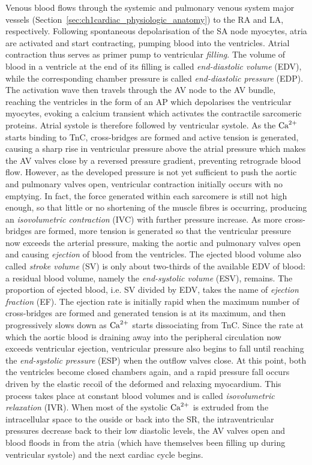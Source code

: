 \vspace{0.2cm}
Venous blood flows through the systemic and pulmonary venous system major vessels (Section~\ref{sec:ch1cardiac_physiologic_anatomy}) to the RA and LA, respectively. Following spontaneous depolarisation of the SA node myocytes, atria are activated and start contracting, pumping blood into the ventricles. Atrial contraction thus serves as primer pump to ventricular \textit{filling}. The volume of blood in a ventricle at the end of its filling is called \textit{end-diastolic volume} (\acs{EDV}), while the corresponding chamber pressure is called \textit{end-diastolic pressure} (\acs{EDP}). The activation wave then travels through the AV node to the AV bundle, reaching the ventricles in the form of an AP which depolarises the ventricular myocytes, evoking a calcium transient which activates the contractile sarcomeric proteins. Atrial systole is therefore followed by ventricular systole. As the $\textrm{Ca}^{2+}$ starts binding to TnC, cross-bridges are formed and active tension is generated, causing a sharp rise in ventricular pressure above the atrial pressure which makes the AV valves close by a reversed pressure gradient, preventing retrograde blood flow. However, as the developed pressure is not yet sufficient to push the aortic and pulmonary valves open, ventricular contraction initially occurs with no emptying. In fact, the force generated within each sarcomere is still not high enough, so that little or no shortening of the muscle fibres is occurring, producing an \textit{isovolumetric contraction} (\acs{IVC}) with further pressure increase. As more cross-bridges are formed, more tension is generated so that the ventricular pressure now exceeds the arterial pressure, making the aortic and pulmonary valves open and causing \textit{ejection} of blood from the ventricles. The ejected blood volume also called \textit{stroke volume} (\acs{SV}) is only about two-thirds of the available EDV of blood: a residual blood volume, namely the \textit{end-systolic volume} (\acs{ESV}), remains. The proportion of ejected blood, i.e. SV divided by EDV, takes the name of \textit{ejection fraction} (\acs{EF}). The ejection rate is initially rapid when the maximum number of cross-bridges are formed and generated tension is at its maximum, and then progressively slows down as $\textrm{Ca}^{2+}$ starts dissociating from TnC. Since the rate at which the aortic blood is draining away into the peripheral circulation now exceeds ventricular ejection, ventricular pressure also begins to fall until reaching the \textit{end-systolic pressure} (\acs{ESP}) when the outflow valves close. At this point, both the ventricles become closed chambers again, and a rapid pressure fall occurs driven by the elastic recoil of the deformed and relaxing myocardium. This process takes place at constant blood volumes and is called \textit{isovolumetric relaxation} (\acs{IVR}). When most of the systolic $\textrm{Ca}^{2+}$ is extruded from the intracellular space to the ouside or back into the SR, the intraventricular pressures decrease back to their low diastolic levels, the AV valves open and blood floods in from the atria (which have themselves been filling up during ventricular systole) and the next cardiac cycle begins.

